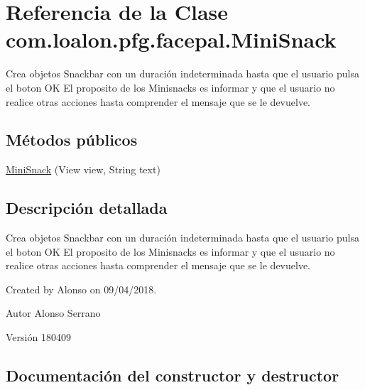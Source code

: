 \hypertarget{classcom_1_1loalon_1_1pfg_1_1facepal_1_1_mini_snack}{}\section{Referencia de la Clase com.\+loalon.\+pfg.\+facepal.\+Mini\+Snack}
\label{classcom_1_1loalon_1_1pfg_1_1facepal_1_1_mini_snack}


Crea objetos Snackbar con un duración indeterminada hasta que el usuario pulsa el boton OK El proposito de los Minisnacks es informar y que el usuario no realice otras acciones hasta comprender el mensaje que se le devuelve.  


\subsection*{Métodos públicos}
\begin{DoxyCompactItemize}
\item 
\mbox{\hyperlink{classcom_1_1loalon_1_1pfg_1_1facepal_1_1_mini_snack_a728b4a87e5b75c567711b17ac9da7192}{Mini\+Snack}} (View view, String text)
\end{DoxyCompactItemize}


\subsection{Descripción detallada}
Crea objetos Snackbar con un duración indeterminada hasta que el usuario pulsa el boton OK El proposito de los Minisnacks es informar y que el usuario no realice otras acciones hasta comprender el mensaje que se le devuelve. 

Created by Alonso on 09/04/2018. \begin{DoxyAuthor}{Autor}
Alonso Serrano 
\end{DoxyAuthor}
\begin{DoxyVersion}{Versión}
180409 
\end{DoxyVersion}


\subsection{Documentación del constructor y destructor}
\mbox{\label{classcom_1_1loalon_1_1pfg_1_1facepal_1_1_mini_snack_a728b4a87e5b75c567711b17ac9da7192}} 
